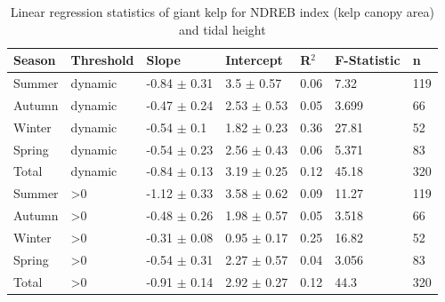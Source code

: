 \documentclass[a4paper,fleqn]{cas-sc}
\begin{document}
\begin{table}[width=.9\linewidth,cols=6,pos=!htbp]
\caption{Linear regression statistics of giant kelp for NDREB index (kelp canopy area) and tidal height}
\small
\begin{tabular*}{\tblwidth}{@{} LLLLLLL@{} }
\toprule
Season & Threshold &Slope & Intercept & R$^{2}$ & F-Statistic & n\\
\midrule
Summer  & dynamic & -0.84 $\pm$ 0.31 & 3.5 $\pm$ 0.57 & 0.06 & 7.32 & 119 \\
Autumn  & dynamic & -0.47 $\pm$ 0.24 & 2.53 $\pm$ 0.53 & 0.05 & 3.699 & 66 \\
Winter  & dynamic & -0.54 $\pm$ 0.1 & 1.82 $\pm$ 0.23 & 0.36 & 27.81 & 52 \\
Spring  & dynamic & -0.54 $\pm$ 0.23 & 2.56 $\pm$ 0.43 & 0.06 & 5.371 & 83 \\
Total  & dynamic & -0.84 $\pm$ 0.13 & 3.19 $\pm$ 0.25 & 0.12 & 45.18 & 320 \\
Summer  & >0 & -1.12 $\pm$ 0.33 & 3.58 $\pm$ 0.62 & 0.09 & 11.27 & 119 \\
Autumn  & >0 & -0.48 $\pm$ 0.26 & 1.98 $\pm$ 0.57 & 0.05 & 3.518 & 66 \\
Winter  & >0 & -0.31 $\pm$ 0.08 & 0.95 $\pm$ 0.17 & 0.25 & 16.82 & 52 \\
Spring  & >0 & -0.54 $\pm$ 0.31 & 2.27 $\pm$ 0.57 & 0.04 & 3.056 & 83 \\
Total  & >0 & -0.91 $\pm$ 0.14 & 2.92 $\pm$ 0.27 & 0.12 & 44.3 & 320 \\
\bottomrule
\end{tabular*}
\label{tab:14}
\end{table}
\end{document}
